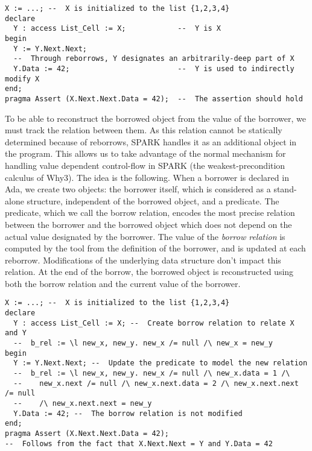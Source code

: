 \documentclass[runningheads]{llncs}
\begin{document}
\begin{lstlisting}
X := ...; --  X is initialized to the list {1,2,3,4}
declare
  Y : access List_Cell := X;            --  Y is X
begin
  Y := Y.Next.Next; 
  --  Through reborrows, Y designates an arbitrarily-deep part of X
  Y.Data := 42;                         --  Y is used to indirectly modify X
end;
pragma Assert (X.Next.Next.Data = 42);  --  The assertion should hold
\end{lstlisting}
To be able to reconstruct the borrowed object from the value of the borrower, we must track the relation between them. As this relation cannot be statically determined because of reborrows, SPARK handles it as an additional object in the program. This allows us to take advantage of the normal mechanism for handling value dependent control-flow in SPARK (the weakest-precondition calculus of Why3).
The idea is the following. When a borrower is declared in Ada, we create two objects: the borrower itself, which is considered as a stand-alone structure, independent of the borrowed object, and a predicate. The predicate, which we call the borrow relation, encodes the most precise relation between the borrower and the borrowed object which does not depend on the actual value designated by the borrower. The value of the \emph{borrow relation} is computed by the tool from the definition of the borrower, and is updated at each reborrow. Modifications of the underlying data structure don't impact this relation. At the end of the borrow, the borrowed object is reconstructed using both the borrow relation and the current value of the borrower.
\begin{lstlisting}
X := ...; --  X is initialized to the list {1,2,3,4}
declare
  Y : access List_Cell := X; --  Create borrow relation to relate X and Y
  --  b_rel := \l new_x, new_y. new_x /= null /\ new_x = new_y
begin
  Y := Y.Next.Next; --  Update the predicate to model the new relation
  --  b_rel := \l new_x, new_y. new_x /= null /\ new_x.data = 1 /\
  --    new_x.next /= null /\ new_x.next.data = 2 /\ new_x.next.next /= null
  --    /\ new_x.next.next = new_y
  Y.Data := 42; --  The borrow relation is not modified
end;
pragma Assert (X.Next.Next.Data = 42);
--  Follows from the fact that X.Next.Next = Y and Y.Data = 42
\end{lstlisting}
\end{document}
